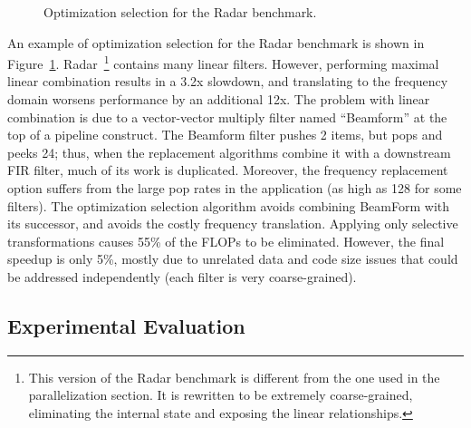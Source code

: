
\begin{figure}[t]
\caption{Optimization selection for the Radar benchmark.\protect\label{fig:radar}}
\end{figure}

An example of optimization selection for the Radar benchmark is shown
in Figure~\ref{fig:radar}.  Radar~\footnote{This version of the Radar
benchmark is different from the one used in the parallelization
section.  It is rewritten to be extremely coarse-grained, eliminating
the internal state and exposing the linear relationships.} contains
many linear filters.  However, performing maximal linear combination
results in a 3.2x slowdown, and translating to the frequency domain
worsens performance by an additional 12x.  The problem with linear
combination is due to a vector-vector multiply filter named
``Beamform'' at the top of a pipeline construct.  The Beamform filter
pushes 2 items, but pops and peeks 24; thus, when the replacement
algorithms combine it with a downstream FIR filter, much of its work
is duplicated.  Moreover, the frequency replacement option suffers
from the large pop rates in the application (as high as 128 for some
filters).  The optimization selection algorithm avoids combining
BeamForm with its successor, and avoids the costly frequency
translation.  Applying only selective transformations causes 55\% of
the FLOPs to be eliminated.  However, the final speedup is only 5\%,
mostly due to unrelated data and code size issues that could be
addressed independently (each filter is very coarse-grained).

\subsection*{Experimental Evaluation}

